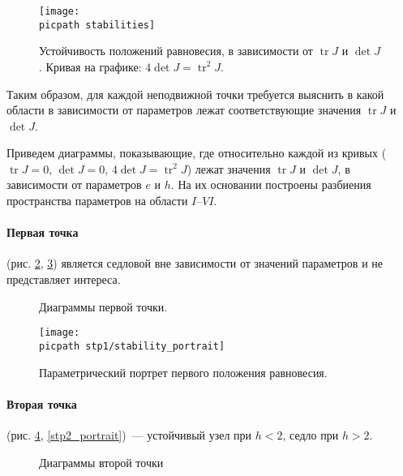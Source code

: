 \documentclass[oneside,final,12pt]{article}
\DeclareMathOperator{\tr}{tr}
\newcommand*\picsize{0.5\textwidth}
\newcommand*\subpicsize{0.45\textwidth}
\newcommand*\picpath{pictures/}
\theoremstyle{plain}
\theoremstyle{remark}
\theoremstyle{definition}
\theoremstyle{plain}
\begin{document}
		\begin{figure}[!h]
			\centering
			\texttt{[image: \\picpath stabilities]}
			\caption{Устойчивость положений равновесия, в зависимости от \(\tr J\) и \(\det J\). Кривая на графике: \(4\det J = \tr^2 J\).} \label{stabilities}
		\end{figure}

		Таким образом, для каждой неподвижной точки требуется выяснить в какой области в зависимости от параметров лежат соответствующие значения \(\tr J\) и \(\det J\). 

		Приведем диаграммы, показывающие, где относительно каждой  из кривых (\(\tr J = 0\), \(\det J = 0\), \(4\det J = \tr^2 J\)) лежат значения \(\tr J\) и \(\det J\), в зависимости от параметров \(e\) и \(h\). На их основании построены разбиения пространства параметров на области \(I\)--\(VI\).
	
	\newpage
	\paragraph{Первая точка} (рис. \ref{stp1_diagrams}, \ref{stp1_portrait}) является седловой вне зависимости от значений параметров и не представляет интереса.

		\begin{figure}[!h]
			\centering
			\:
			\:
			\caption{Диаграммы первой точки.}\label{stp1_diagrams}
		\end{figure}

		\begin{figure}[!h]
			\centering
			\texttt{[image: \\picpath stp1/stability\_portrait]}
			\caption{Параметрический портрет первого положения равновесия.} \label{stp1_portrait}
		\end{figure}

	\newpage
	\paragraph{Вторая точка} (рис. \ref{stp2_diagrams}, \ref{stp2_portrait})~--- устойчивый узел при \(h < 2\), седло при \(h > 2\).

		\begin{figure}[!h]
			\centering
			\:
			\:
			\caption{Диаграммы второй точки}\label{stp2_diagrams}
		\end{figure}
\end{document}
